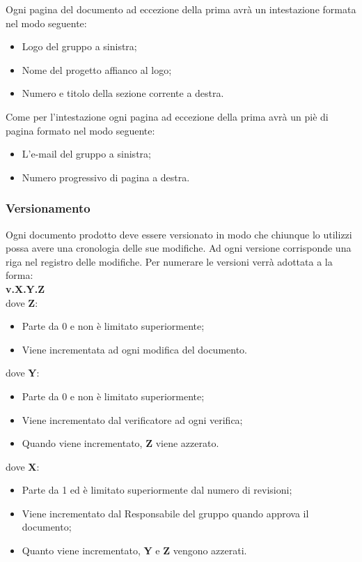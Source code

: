 \documentclass[a4paper,11pt]{article}
\begin{document}
				Ogni pagina del documento ad eccezione della prima avrà un intestazione formata nel modo seguente:
				\begin{itemize}
				\item Logo del  gruppo a sinistra;
				\item Nome del progetto affianco al logo;
				\item Numero e titolo della sezione corrente a destra.
	\end{itemize}			
				 Come per l'intestazione ogni pagina ad eccezione della prima avrà un piè di pagina formato nel modo seguente:
				 \begin{itemize}
				 \item L'e-mail del gruppo a sinistra;
				 \item Numero progressivo di pagina a destra.
	\end{itemize}			  
			\subsubsection{Versionamento}
			Ogni documento prodotto deve essere versionato in modo che chiunque lo utilizzi possa avere una cronologia delle sue modifiche. Ad ogni versione corrisponde una riga nel registro delle modifiche. Per numerare le versioni verrà adottata a la forma: \\ 
			 \textbf{{\centering  v.X.Y.Z }}
			\\
			dove \textbf{Z}:
			\begin{itemize}
			\item Parte da 0 e non è limitato superiormente;
			\item Viene incrementata ad ogni modifica del documento.
			\end{itemize}
			dove \textbf{Y}:
			\begin{itemize}
			\item Parte da 0 e non è limitato superiormente;
			\item Viene incrementato dal verificatore ad ogni verifica;
			\item Quando viene incrementato, \textbf{Z} viene azzerato.
			\end{itemize}
			dove \textbf{X}:
			\begin{itemize}
			\item Parte da 1 ed è limitato superiormente dal numero di revisioni;
			\item Viene incrementato dal Responsabile del gruppo quando approva il documento;
			\item Quanto viene incrementato, \textbf{Y} e \textbf{Z} vengono azzerati.
			\end{itemize}
			
\end{document}
